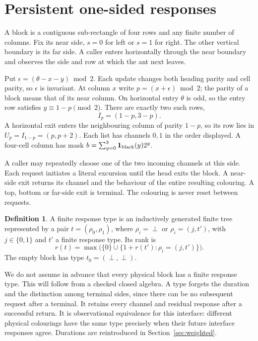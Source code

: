 \documentclass[11pt]{article}
\theoremstyle{definition}\newtheorem{definition}[theorem]{Definition}
\newcommand{\botv}{\perp}
\begin{document}
\section{Persistent one-sided responses}
A block is a contiguous sub-rectangle of four rows and any finite number
of columns. Fix its near side, $s=0$ for left or $s=1$ for right. The other
vertical boundary is its far side. A caller enters horizontally through the
near boundary and observes the side and row at which the ant next leaves.

Put $\epsilon=(\theta-x-y)\bmod2$. Each update changes both heading parity and
cell parity, so $\epsilon$ is invariant. At column $x$ write
$p=(x+\epsilon)\bmod2$; the parity of a block means that of its near column.
On horizontal entry $\theta$ is odd, so the entry row satisfies
$y\equiv1-p\pmod2$. There are exactly two such rows,
\[
 I_p=(1-p,3-p).
\]
A horizontal exit enters the neighbouring column of parity $1-p$, so its
row lies in $U_p=I_{1-p}=(p,p+2)$. Each list has channels $0,1$ in the
order displayed. A four-cell column has mask
$b=\sum_{y=0}^3\mathbf1_{\rm black}(y)2^y$.

A caller may repeatedly choose one of the two incoming channels at
this side. Each request initiates a literal excursion until the head exits the
block. A near-side exit returns its channel and the behaviour of the entire
resulting colouring. A top, bottom or far-side exit is terminal. The colouring
is never reset between requests.

\begin{definition}
A finite response type is an inductively generated finite tree represented
by a pair $t=(\rho_0,\rho_1)$, where $\rho_i=\botv$ or
$\rho_i=(j,t')$, with $j\in\{0,1\}$ and $t'$ a finite response type.
Its rank is
\[
 r(t)=\max\bigl(\{0\}\cup\{1+r(t'): \rho_i=(j,t')\}\bigr).
\]
The empty block has type $t_0=(\botv,\botv)$.
\end{definition}

We do not assume in advance that every physical block has a finite response
type. This will follow from a checked closed algebra. A type forgets the duration
and the distinction among terminal sides, since there can be no subsequent
request after a terminal. It retains every channel and residual response after
a successful return. It is observational equivalence for this interface: different physical
colourings have the same type precisely when their future interface responses
agree. Durations are reintroduced in Section~\ref{sec:weighted}.
\end{document}
